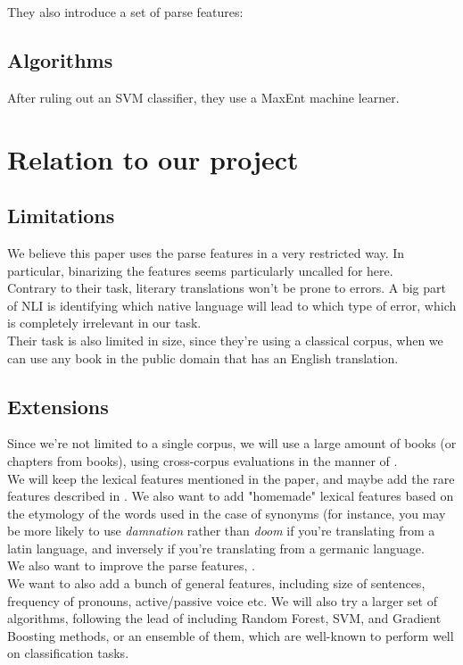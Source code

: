 \documentclass[10pt]{article}
\begin{document}
They also introduce a set of parse features:


\subsection*{Algorithms}
After ruling out an SVM classifier, they use a MaxEnt machine learner.


\section{Relation to our project}
\subsection{Limitations}
We believe this paper uses the parse features in a very restricted way. In particular, binarizing the features seems particularly uncalled for here. \\
Contrary to their task, literary translations won't be prone to errors. A big part of NLI is identifying which native language will lead to which type of error, which is completely irrelevant in our task. \\
Their task is also limited in size, since they're using a classical corpus, when we can use any book in the public domain that has an English translation.

\subsection{Extensions}
Since we're not limited to a single corpus, we will use a large amount of books (or chapters from books), using cross-corpus evaluations in the manner of \cite{brooke2012robust}. \\
We will keep the lexical features mentioned in the paper, and maybe add the rare features described in \cite{brooke2012measuring}. We also want to add "homemade" lexical features based on the etymology of the words used in the case of synonyms (for instance, you may be more likely to use \emph{damnation} rather than \emph{doom} if you're translating from a latin language, and inversely if you're translating from a germanic language. \\
We also want to improve the parse features, \cite{}. \\
We want to also add a bunch of general features, including size of sentences, frequency of pronouns, active/passive voice etc.
We will also try a larger set of algorithms, following the lead of \cite{tetreault2013report} including Random Forest, SVM, and Gradient Boosting methods, or an ensemble of them, which are well-known to perform well on classification tasks.





\end{document}
